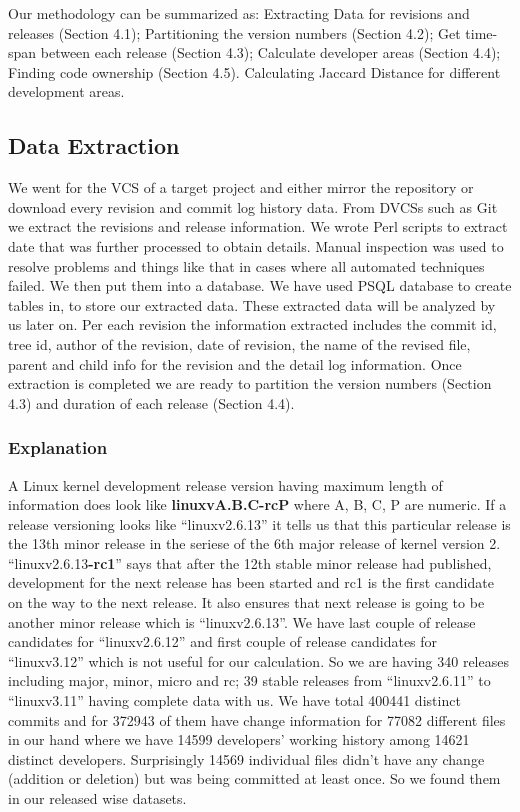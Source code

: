 \documentclass{acm_proc_article-sp}
\begin{document}
Our methodology can be summarized as: Extracting Data for revisions and releases (Section 4.1); Partitioning the version numbers (Section 4.2); Get time-span between each release (Section 4.3); Calculate developer areas (Section 4.4); Finding code ownership (Section 4.5). Calculating Jaccard Distance for different development areas.

\subsection{Data Extraction}
We went for the VCS of a target project and either mirror the repository or download every revision and commit log history data. From DVCSs such as Git we extract the revisions and release information. We wrote Perl scripts to extract date that was further processed to obtain details. Manual inspection was used to resolve problems and things like that in cases where all automated techniques failed.
We then put them into a database. We have used PSQL database to create tables in, to store our extracted data. These extracted data will be analyzed by us later on. Per each revision the information extracted includes the commit id, tree id, author of the revision, date of revision, the name of the revised file, parent and child info for the revision and the detail log information. Once extraction is completed we are ready to partition the version numbers (Section 4.3) and duration  of each release (Section 4.4).

\subsubsection{Explanation}
A Linux kernel development release version having maximum length of information does look like \textbf{linuxvA.B.C-rcP} where A, B, C, P are numeric. If a release versioning looks like ``linuxv2.6.13'' it tells us that this particular release is the 13th minor release  in the seriese of the 6th major release of kernel version 2. ``linuxv2.6.13\textbf{-rc1}'' says that after the 12th stable minor release had published, development for the next release has been started and rc1 is the first candidate on the way to the next release. It also ensures that next release is going to be another minor release which is ``linuxv2.6.13''. We have last couple of release candidates for ``linuxv2.6.12'' and first couple of release candidates for ``linuxv3.12'' which is not useful for our calculation. So we are having 340 releases including major, minor, micro and rc; 39 stable releases from ``linuxv2.6.11'' to ``linuxv3.11'' having complete data with us. We have total 400441 distinct commits and for 372943 of them have change information for 77082 different files in our hand where we have 14599 developers' working history among 14621 distinct developers. Surprisingly 14569 individual files didn't have any change (addition or deletion) but was being committed at least once. So we found them in our released wise datasets.
\end{document}
